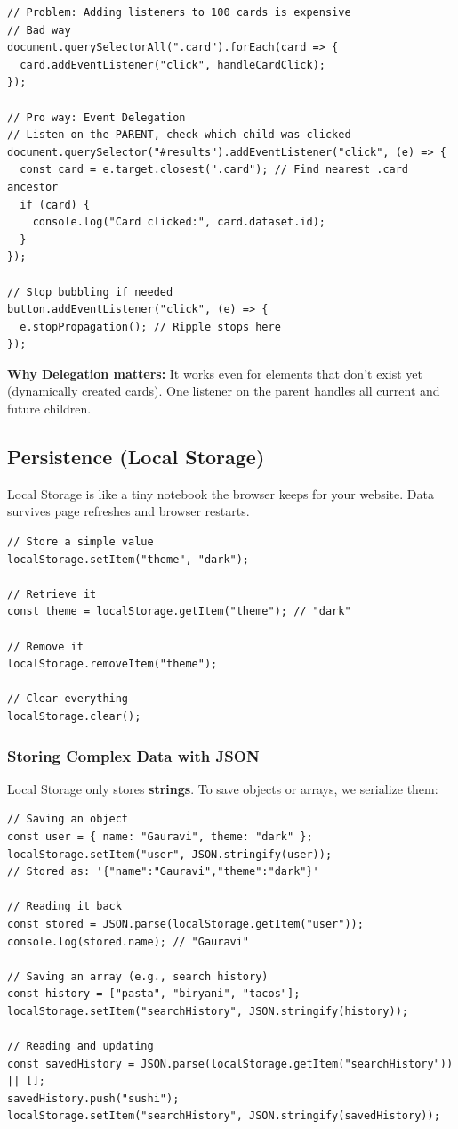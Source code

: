 \documentclass[12pt]{article}
\begin{document}
\begin{lstlisting}
// Problem: Adding listeners to 100 cards is expensive
// Bad way
document.querySelectorAll(".card").forEach(card => {
  card.addEventListener("click", handleCardClick);
});

// Pro way: Event Delegation
// Listen on the PARENT, check which child was clicked
document.querySelector("#results").addEventListener("click", (e) => {
  const card = e.target.closest(".card"); // Find nearest .card ancestor
  if (card) {
    console.log("Card clicked:", card.dataset.id);
  }
});

// Stop bubbling if needed
button.addEventListener("click", (e) => {
  e.stopPropagation(); // Ripple stops here
});
\end{lstlisting}

\textbf{Why Delegation matters:} It works even for elements that don't exist yet (dynamically created cards). One listener on the parent handles all current and future children.

\subsection{Persistence (Local Storage)}

Local Storage is like a tiny notebook the browser keeps for your website. Data survives page refreshes and browser restarts.

\begin{lstlisting}
// Store a simple value
localStorage.setItem("theme", "dark");

// Retrieve it
const theme = localStorage.getItem("theme"); // "dark"

// Remove it
localStorage.removeItem("theme");

// Clear everything
localStorage.clear();
\end{lstlisting}

\subsubsection*{Storing Complex Data with JSON}

Local Storage only stores \textbf{strings}. To save objects or arrays, we serialize them:

\begin{lstlisting}
// Saving an object
const user = { name: "Gauravi", theme: "dark" };
localStorage.setItem("user", JSON.stringify(user));
// Stored as: '{"name":"Gauravi","theme":"dark"}'

// Reading it back
const stored = JSON.parse(localStorage.getItem("user"));
console.log(stored.name); // "Gauravi"

// Saving an array (e.g., search history)
const history = ["pasta", "biryani", "tacos"];
localStorage.setItem("searchHistory", JSON.stringify(history));

// Reading and updating
const savedHistory = JSON.parse(localStorage.getItem("searchHistory")) || [];
savedHistory.push("sushi");
localStorage.setItem("searchHistory", JSON.stringify(savedHistory));
\end{lstlisting}
\end{document}
